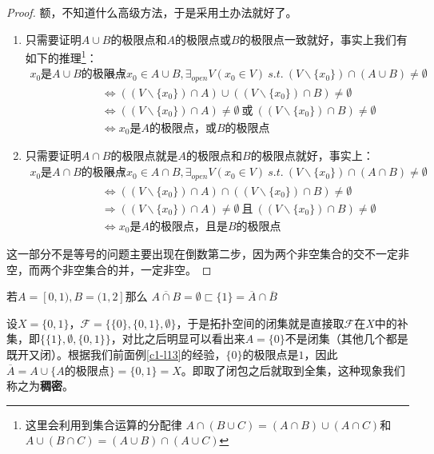 \documentclass[lang=cn,10pt,device=pad]{elegantbook}
\newcommand{\tp}{\mathscr{F}}
\newcommand{\st}{~s.t.~}
\newcommand{\dkh}[1]{\{#1\}}
\newcommand{\xkh}[1]{\left(#1\right)}
\newcommand{\chadiao}{\backslash}
\begin{document}
\begin{proof}
	额，不知道什么高级方法，于是采用土办法就好了。
	\begin{enumerate}
		\item  只需要证明$A\cup B$的极限点和$A$的极限点或$B$的极限点一致就好，事实上我们有如下的推理\footnote{这里会利用到集合运算的分配律 $A\cap (B\cup C) = (A\cap B)\cup(A\cap C)$和$A\cup (B\cap C) = (A\cup B)\cap(A\cup C)$}：
		\begin{equation*}
			\begin{aligned}
				x_{0}\text{是}A\cup B\text{的极限点}&\iff \forall x_{0}\in A\cup B , \exists_{open}V(x_{0}\in V) \st (V\chadiao\dkh{x_{0}})\cap (A\cup B)\neq \emptyset\\
				&\iff \xkh{(V\chadiao\dkh{x_{0}})\cap A}\cup \xkh{(V\chadiao\dkh{x_{0}})\cap B} \neq \emptyset\\
				&\iff \xkh{(V\chadiao\dkh{x_{0}})\cap A}\neq \emptyset~\text{或}~\xkh{(V\chadiao\dkh{x_{0}})\cap B}\neq \emptyset\\
				&\iff x_{0}\text{是}A\text{的极限点，或}B\text{的极限点}
			\end{aligned}
		\end{equation*}
		\item 只需要证明$A\cap B$的极限点就是$A$的极限点和$B$的极限点就好，事实上：
		\begin{equation*}
			\begin{aligned}
				x_{0}\text{是}A\cap B\text{的极限点}&\iff \forall x_{0}\in A\cap B , \exists_{open}V(x_{0}\in V) \st (V\chadiao\dkh{x_{0}})\cap (A\cap B)\neq \emptyset\\
				&\iff \xkh{(V\chadiao\dkh{x_{0}})\cap A}\cap \xkh{(V\chadiao\dkh{x_{0}})\cap B} \neq \emptyset\\
				&\Longrightarrow \xkh{(V\chadiao\dkh{x_{0}})\cap A}\neq \emptyset~\text{且}~\xkh{(V\chadiao\dkh{x_{0}})\cap B}\neq \emptyset\\
				&\iff x_{0}\text{是}A\text{的极限点，且是}B\text{的极限点}
			\end{aligned}
		\end{equation*}
	\end{enumerate}
	这一部分不是等号的问题主要出现在倒数第二步，因为两个非空集合的交不一定非空，而两个非空集合的并，一定非空。
\end{proof}
\begin{example}[上命题第二部分不能取等]
若$A = [0,1) , B = (1,2]$那么	$\overline{A\cap B}  = \emptyset \sqsubset  \dkh{1} = \overline{A}\cap \overline{B}  $
\end{example}
\begin{example}[单点集不一定是闭集，稠密]
	设$X=\dkh{0,1}$，$\tp =\dkh{\dkh{0},\dkh{0,1},\emptyset}$，于是拓扑空间的闭集就是直接取$\tp$在$X$中的补集，即$\dkh{\dkh{1},\emptyset,\dkh{0,1}}$，对比之后明显可以看出来$A = \dkh{0}$不是闭集（其他几个都是既开又闭）。根据我们前面例\ref{c1-l13}的经验，$\dkh{0}$的极限点是$1$，因此$\overline{A} = A\cup \dkh{A\text{的极限点}} = \dkh{0,1} = X$。即取了闭包之后就取到全集，这种现象我们称之为\textbf{稠密}。
\end{example}
\end{document}
